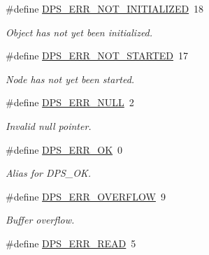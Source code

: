 \begin{DoxyCompactItemize}
\#define \hyperlink{group__status_ga92b1c68aa4f1526347ccb76aa9382d76}{D\+P\+S\+\_\+\+E\+R\+R\+\_\+\+N\+O\+T\+\_\+\+I\+N\+I\+T\+I\+A\+L\+I\+Z\+ED}~18
\begin{DoxyCompactList}\small\item\em Object has not yet been initialized. \end{DoxyCompactList}\item 
\mbox{\label{group__status_ga40f77c0ef70f691e6e158c8756ad8895}} 
\#define \hyperlink{group__status_ga40f77c0ef70f691e6e158c8756ad8895}{D\+P\+S\+\_\+\+E\+R\+R\+\_\+\+N\+O\+T\+\_\+\+S\+T\+A\+R\+T\+ED}~17
\begin{DoxyCompactList}\small\item\em Node has not yet been started. \end{DoxyCompactList}\item 
\mbox{\label{group__status_ga36c4d95c785c30cd74bb4498703ae231}} 
\#define \hyperlink{group__status_ga36c4d95c785c30cd74bb4498703ae231}{D\+P\+S\+\_\+\+E\+R\+R\+\_\+\+N\+U\+LL}~2
\begin{DoxyCompactList}\small\item\em Invalid null pointer. \end{DoxyCompactList}\item 
\mbox{\label{group__status_ga9127c1d49f4ca6a51c5585efc76ce362}} 
\#define \hyperlink{group__status_ga9127c1d49f4ca6a51c5585efc76ce362}{D\+P\+S\+\_\+\+E\+R\+R\+\_\+\+OK}~0
\begin{DoxyCompactList}\small\item\em Alias for D\+P\+S\+\_\+\+OK. \end{DoxyCompactList}\item 
\mbox{\label{group__status_ga54ee1a62589bee7cd9e82acfd4fa1cad}} 
\#define \hyperlink{group__status_ga54ee1a62589bee7cd9e82acfd4fa1cad}{D\+P\+S\+\_\+\+E\+R\+R\+\_\+\+O\+V\+E\+R\+F\+L\+OW}~9
\begin{DoxyCompactList}\small\item\em Buffer overflow. \end{DoxyCompactList}\item 
\mbox{\label{group__status_ga6030b4923c05c4ad75e89b3b7b923c5f}} 
\#define \hyperlink{group__status_ga6030b4923c05c4ad75e89b3b7b923c5f}{D\+P\+S\+\_\+\+E\+R\+R\+\_\+\+R\+E\+AD}~5

\end{DoxyCompactItemize}
